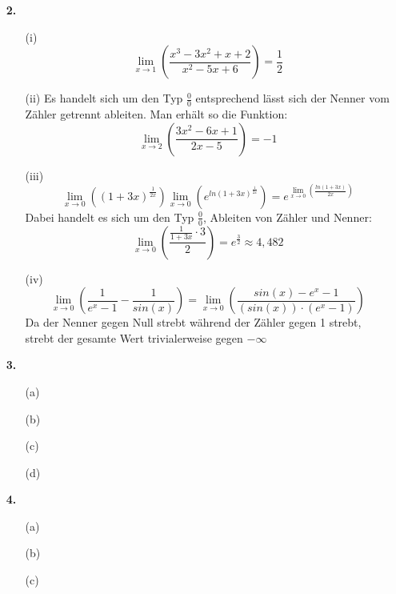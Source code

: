 \documentclass[a4paper,11pt,fleqn]{scrartcl}
\newcommand{\bra}[1]{\left(#1\right)}
\newcommand{\limxx}[2]{\lim\limits_{x \rightarrow #1}\bra{#2}}
\begin{document}
\begin{enumerate}
\begin{enumerate}
        \end{enumerate}
    \item[\textbf{2.}]
        \begin{enumerate}
            \item[(i)]
                \[ \limxx{1}{\frac{x^3 - 3x^2 + x + 2}{x^2 - 5x + 6}} = \frac{1}{2}\]
            \item[(ii)]
                Es handelt sich um den Typ $\frac{0}{0}$ entsprechend lässt sich der Nenner vom Zähler getrennt ableiten.
                Man erhält so die Funktion: \[ \limxx{2}{\frac{3x^2 - 6x + 1}{2x - 5}} = -1\]
            \item[(iii)]
                \[ \limxx{0}{(1+3x)^\frac{1}{2x}} \limxx{0}{e^{ln(1+3x)^\frac{1}{2x}}} = e^{\limxx{0}{\frac{ln(1+3x)}{2x}}} \]
                Dabei handelt es sich um den Typ $\frac{0}{0}$, Ableiten von Zähler und Nenner:
                \[ \limxx{0}{\frac{ \frac{1}{1+3x} \cdot 3 }{2}} = e^{\frac{3}{2}} \approx 4,482 \]
            \item[(iv)]
                \[ \limxx{0}{ \frac{1}{e^x - 1} - \frac{1}{sin(x)}} = \limxx{0}{\frac{sin(x) - e^x - 1}{(sin(x)) \cdot (e^x-1)}} \]
                Da der Nenner gegen Null strebt während der Zähler gegen 1 strebt, strebt der gesamte Wert trivialerweise gegen $- \infty$
        \end{enumerate}
    \item[\textbf{3.}]
        \begin{enumerate}
            \item[(a)]
            \item[(b)]
            \item[(c)]
            \item[(d)]
        \end{enumerate}
    \item[\textbf{4.}]
        \begin{enumerate}
            \item[(a)]
            \item[(b)]
            \item[(c)]
        \end{enumerate}
\end{enumerate}
\end{document}
